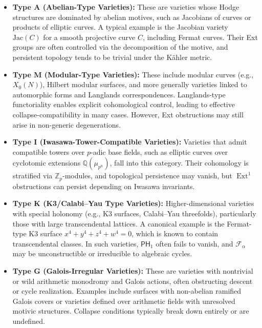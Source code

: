 \documentclass[11pt]{article}
\DeclareMathOperator{\Ext}{Ext}
\begin{document}
\begin{itemize}
  \item \textbf{Type A (Abelian-Type Varieties):}  
  These are varieties whose Hodge structures are dominated by abelian motives, such as Jacobians of curves or products of elliptic curves. A typical example is the Jacobian variety $\mathrm{Jac}(C)$ for a smooth projective curve $C$, including Fermat curves. Their Ext groups are often controlled via the decomposition of the motive, and persistent topology tends to be trivial under the Kähler metric.

  \item \textbf{Type M (Modular-Type Varieties):}  
  These include modular curves (e.g., $X_0(N)$), Hilbert modular surfaces, and more generally varieties linked to automorphic forms and Langlands correspondences. Langlands-type functoriality enables explicit cohomological control, leading to effective collapse-compatibility in many cases. However, Ext obstructions may still arise in non-generic degenerations.

  \item \textbf{Type I (Iwasawa-Tower-Compatible Varieties):}  
  Varieties that admit compatible towers over $p$-adic base fields, such as elliptic curves over cyclotomic extensions $\mathbb{Q}(\mu_{p^n})$, fall into this category. Their cohomology is stratified via $\mathbb{Z}_p$-modules, and topological persistence may vanish, but $\Ext^1$ obstructions can persist depending on Iwasawa invariants.

  \item \textbf{Type K (K3/Calabi–Yau Type Varieties):}  
  Higher-dimensional varieties with special holonomy (e.g., K3 surfaces, Calabi–Yau threefolds), particularly those with large transcendental lattices. A canonical example is the Fermat-type K3 surface $x^4 + y^4 + z^4 + w^4 = 0$, which is known to contain transcendental classes. In such varieties, $\mathsf{PH}_1$ often fails to vanish, and $\mathcal{F}_\alpha$ may be unconstructible or irreducible to algebraic cycles.

  \item \textbf{Type G (Galois-Irregular Varieties):}  
  These are varieties with nontrivial or wild arithmetic monodromy and Galois actions, often obstructing descent or cycle realization. Examples include surfaces with non-abelian ramified Galois covers or varieties defined over arithmetic fields with unresolved motivic structures. Collapse conditions typically break down entirely or are undefined.
\end{itemize}
\end{document}
